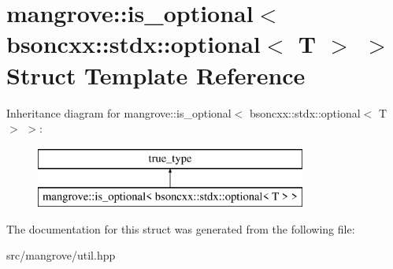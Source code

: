 \hypertarget{structmangrove_1_1is__optional_3_01bsoncxx_1_1stdx_1_1optional_3_01T_01_4_01_4}{}\section{mangrove\+:\+:is\+\_\+optional$<$ bsoncxx\+:\+:stdx\+:\+:optional$<$ T $>$ $>$ Struct Template Reference}
\label{structmangrove_1_1is__optional_3_01bsoncxx_1_1stdx_1_1optional_3_01T_01_4_01_4}
Inheritance diagram for mangrove\+:\+:is\+\_\+optional$<$ bsoncxx\+:\+:stdx\+:\+:optional$<$ T $>$ $>$\+:\begin{figure}[H]
\begin{center}
\leavevmode
\includegraphics[height=2.000000cm]{structmangrove_1_1is__optional_3_01bsoncxx_1_1stdx_1_1optional_3_01T_01_4_01_4}
\end{center}
\end{figure}


The documentation for this struct was generated from the following file\+:\begin{DoxyCompactItemize}
\item 
src/mangrove/util.\+hpp\end{DoxyCompactItemize}
